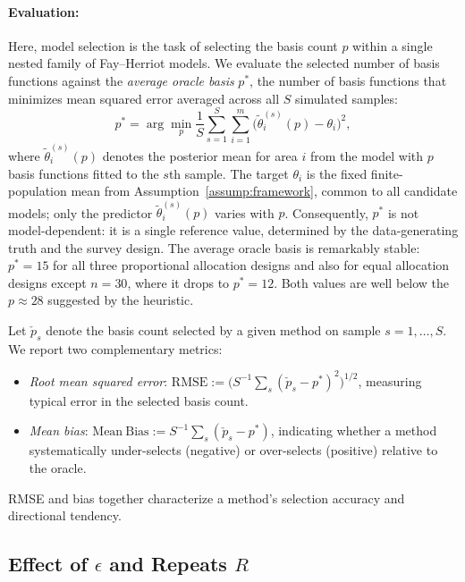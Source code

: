 \documentclass[11pt]{article}
\theoremstyle{plain}
\theoremstyle{definition}
\theoremstyle{remark}
\begin{document}
\paragraph{Evaluation:} Here, model selection is the task of
selecting the basis count $p$ within a single nested family of
Fay--Herriot models. We evaluate the selected number of basis functions
against the \textit{average oracle basis} $p^*$, the number of basis
functions that minimizes mean squared error averaged across all $S$
simulated samples:
\[
p^* = \arg\min_p \frac{1}{S} \sum_{s=1}^{S} \sum_{i=1}^m
  \bigl(\tilde{\theta}_i^{(s)}(p) - \theta_i\bigr)^2,
\]
where $\tilde{\theta}_i^{(s)}(p)$ denotes the posterior mean for area
$i$ from the model with $p$ basis functions fitted to the $s$th sample.
The target $\theta_i$ is the fixed finite-population mean from
Assumption~\ref{assump:framework}, common to all candidate models; only
the predictor $\tilde{\theta}_i^{(s)}(p)$ varies with $p$.
Consequently, $p^*$ is not model-dependent: it is a single reference
value, determined by the data-generating truth and the survey design.
The average oracle basis is remarkably stable: $p^* = 15$ for all three
proportional allocation designs and also for equal allocation designs
except $n = 30$, where it drops to $p^* = 12$. Both values are well
below the $p \approx 28$ suggested by the \citet{hughes_dimension_2013}
heuristic.

Let $\check{p}_s$ denote the basis count selected by a given method on
sample $s = 1, \ldots, S$. We report two complementary metrics:
\begin{itemize}
  \item \textit{Root mean squared error}:
    $\mathrm{RMSE} := \bigl(S^{-1} \sum_s
    (\check{p}_s - p^*)^2\bigr)^{1/2}$, measuring typical error in the
    selected basis count.
  \item \textit{Mean bias}:
    $\mathrm{Mean\ Bias} := S^{-1} \sum_s (\check{p}_s - p^*)$, indicating
    whether a method systematically under-selects (negative) or
    over-selects (positive) relative to the oracle.
\end{itemize}
RMSE and bias together characterize a method's selection accuracy and
directional tendency.


\subsection{Effect of \texorpdfstring{$\epsilon$}{epsilon} and Repeats \texorpdfstring{$R$}{R}}\label{sec:eps_repeat}
\end{document}

